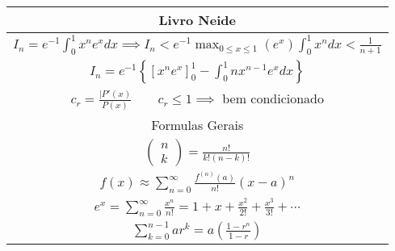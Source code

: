 \documentclass{article}
\begin{document}
\begin{tabularx}{.5\textwidth}{c}
\toprule
Livro Neide\\
\midrule
$ I_n = e^{-1} \displaystyle \int_0^1 x^n e^x dx \implies I_n < e^{-1} \max_{0\leq x \leq 1}(e^x) \displaystyle \int_0^1 x^n dx < \frac{1}{n+1} $\\
$ I_n = e^{-1} \left\{ \displaystyle \left[x^n e^x \right]_0^1 - \displaystyle \int_0^1 n x^{n-1} e^x dx \right\} $\\
$ c_r = \frac{|P'(x)}{P(x)}\qquad c_r \leq 1 \implies$ bem condicionado \\
\midrule
Formulas Gerais\\
\midrule
$ 
\left( \begin{array}{c}
n\\
k
\end{array}
\right) = \frac{n!}{k!(n-k)!}$\\
$ f(x) \approx \displaystyle \sum_{n=0}^{\infty} \frac{f^{(n)}(a)}{n!}(x-a)^n $\\
$ e^{x} = \sum^{\infty}_{n=0} \frac{x^n}{n!} = 1 + x + \frac{x^2}{2!} + \frac{x^3}{3!} + \cdots $\\
$ \displaystyle \sum_{k=0}^{n-1} ar^k= a \left(\frac{1-r^{n}}{1-r}\right) $\\
\bottomrule
\end{tabularx}
\end{document}
